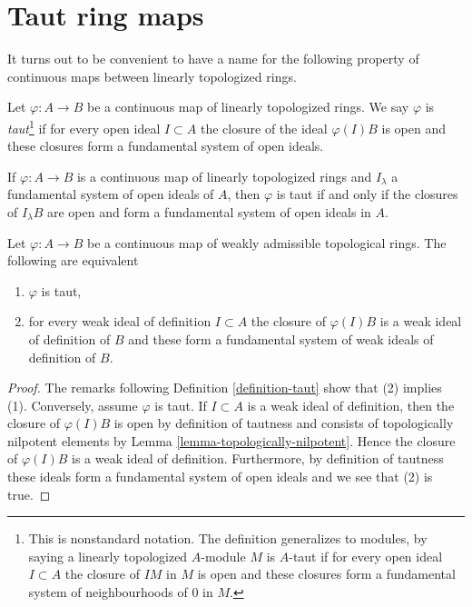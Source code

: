 








\section{Taut ring maps}
\label{section-taut-ring-maps}

\noindent
It turns out to be convenient to have a name for the following property
of continuous maps between linearly topologized rings.

\begin{definition}
\label{definition-taut}
Let $\varphi : A \to B$ be a continuous map of linearly topologized rings.
We say $\varphi$ is {\it taut}\footnote{This is nonstandard notation.
The definition generalizes to modules, by saying a linearly topologized
$A$-module $M$ is $A$-taut if for every open ideal $I \subset A$ the closure
of $IM$ in $M$ is open and these closures form a fundamental system of
neighbourhoods of $0$ in $M$.}
if for every open ideal $I \subset A$ the closure of the ideal $\varphi(I)B$
is open and these closures form a fundamental system of open ideals.
\end{definition}

\noindent
If $\varphi : A \to B$ is a continuous map of linearly topologized rings
and $I_\lambda$ a fundamental system of open ideals of $A$, then $\varphi$
is taut if and only if
the closures of $I_\lambda B$ are open and form a fundamental
system of open ideals in $A$.

\begin{lemma}
\label{lemma-taut-weakly-admissible}
Let $\varphi : A \to B$ be a continuous map of weakly admissible topological
rings. The following are equivalent
\begin{enumerate}
\item $\varphi$ is taut,
\item for every weak ideal of definition $I \subset A$ the closure of
$\varphi(I)B$ is a weak ideal of definition of $B$ and these form a
fundamental system of weak ideals of definition of $B$.
\end{enumerate}
\end{lemma}

\begin{proof}
The remarks following Definition \ref{definition-taut} show that
(2) implies (1). Conversely, assume $\varphi$ is taut. If $I \subset A$
is a weak ideal of definition, then the closure of $\varphi(I)B$
is open by definition of tautness and consists of topologically
nilpotent elements by Lemma \ref{lemma-topologically-nilpotent}.
Hence the closure of $\varphi(I)B$ is a weak ideal of definition.
Furthermore, by definition of tautness these ideals form a
fundamental system of open ideals and we see that (2) is true.
\end{proof}

